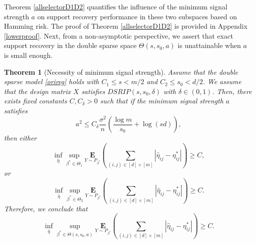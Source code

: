 \documentclass[12pt]{article}
\newtheorem{theorem}{Theorem}
\begin{document}
Theorem \ref{allselectorD1D2} quantifies the influence of the minimum signal strength $a$ on support recovery performance in these two subspaces based on Hamming risk. 
The proof of Theorem \ref{allselectorD1D2} is provided in Appendix \ref{lowerproof}.
Next, from a non-asymptotic perspective, we assert that exact support recovery in the double sparse space ${\Theta}(s,s_0, a)$ is unattainable when $a$ is small enough. 

\begin{theorem}[Necessity of minimum signal strength]\label{LB2priors}
Assume that the double sparse model \eqref{orireg} holds with $C_1 \le s< m/2$ and $C_2 \le s_0<d/2$. 
We assume that the design matrix $X$ satisfies $DSRIP(s,s_0, \delta)$ with $\delta \in (0,1)$. 
Then, there exists fixed constants $C, C_\delta>0$ such that if the minimum signal strength $a$ satisfies
\begin{equation}\label{eq: sep}
a^2 \le C_\delta \frac{\sigma^2}{n} \left( \frac{\log m}{s_0} + \log(sd)  \right),
\end{equation}
then either
\begin{equation}
\inf_{\hat \eta} \sup_{\beta^* \in {\Theta}_1} \underset{Y \sim P_{\beta^*} }{\mathbf{E}} \left( \sum_{(i,j)\in [d]\times[m]} |\hat{\eta}_{ij}  - \eta^*_{ij}| \right) 
\ge C,
\end{equation}
or
\begin{equation}
\inf_{\hat \eta} \sup_{\beta^* \in {\Theta}_2} \underset{Y \sim P_{\beta^*} }{\mathbf{E}} \left( \sum_{(i,j)\in [d]\times[m]} |\hat{\eta}_{ij}  - \eta^*_{ij}| \right) 
\ge C.
\end{equation}
Therefore, we conclude that
\begin{equation}
\inf_{\hat \eta} \sup_{\beta^* \in {\Theta}(s,s_0,a)} \underset{Y \sim P_{\beta^*} }{\mathbf{E}} \left( \sum_{(i,j)\in [d]\times[m]} |\hat{\eta}_{ij}  - \eta^*_{ij}| \right) 
\ge C.
\end{equation}
\end{theorem}
\end{document}

